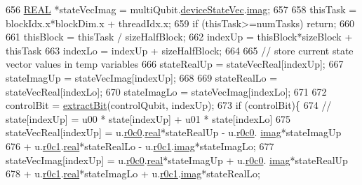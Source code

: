 \begin{DoxyCode}
656     \mbox{\hyperlink{QuEST__precision_8h_a4b654506f18b8bfd61ad2a29a7e38c25}{REAL}} *stateVecImag = multiQubit.\mbox{\hyperlink{structMultiQubit_a59ac613486a41b8c9a4b6e79cc8d2cc3}{deviceStateVec}}.\mbox{\hyperlink{structComplexArray_a79dde47c7ae530c79cebfdf57b225968}{imag}};
657 
658     thisTask = blockIdx.x*blockDim.x + threadIdx.x;
659     \textcolor{keywordflow}{if} (thisTask>=numTasks) \textcolor{keywordflow}{return};
660 
661     thisBlock   = thisTask / sizeHalfBlock;
662     indexUp     = thisBlock*sizeBlock + thisTask%
663     indexLo     = indexUp + sizeHalfBlock;
664 
665     \textcolor{comment}{// store current state vector values in temp variables}
666     stateRealUp = stateVecReal[indexUp];
667     stateImagUp = stateVecImag[indexUp];
668 
669     stateRealLo = stateVecReal[indexLo];
670     stateImagLo = stateVecImag[indexLo];
671 
672     controlBit = \mbox{\hyperlink{QuEST__env__localGPU_8cu_a6ffa51987d8ad8f6c0fc07fd3492277f}{extractBit}}(controlQubit, indexUp);
673     \textcolor{keywordflow}{if} (controlBit)\{
674         \textcolor{comment}{// state[indexUp] = u00 * state[indexUp] + u01 * state[indexLo]}
675         stateVecReal[indexUp] = u.\mbox{\hyperlink{structComplexMatrix2_ae72b4458233b077a636beee1892e81ff}{r0c0}}.\mbox{\hyperlink{structComplex_a479ad939835457595fcca3ca55c06283}{real}}*stateRealUp - u.\mbox{\hyperlink{structComplexMatrix2_ae72b4458233b077a636beee1892e81ff}{r0c0}}.
      \mbox{\hyperlink{structComplex_a1151948284b21c0052f203f23ab931d9}{imag}}*stateImagUp 
676             + u.\mbox{\hyperlink{structComplexMatrix2_a0f3932f055a8b05cef361bce25d51172}{r0c1}}.\mbox{\hyperlink{structComplex_a479ad939835457595fcca3ca55c06283}{real}}*stateRealLo - u.\mbox{\hyperlink{structComplexMatrix2_a0f3932f055a8b05cef361bce25d51172}{r0c1}}.\mbox{\hyperlink{structComplex_a1151948284b21c0052f203f23ab931d9}{imag}}*stateImagLo;
677         stateVecImag[indexUp] = u.\mbox{\hyperlink{structComplexMatrix2_ae72b4458233b077a636beee1892e81ff}{r0c0}}.\mbox{\hyperlink{structComplex_a479ad939835457595fcca3ca55c06283}{real}}*stateImagUp + u.\mbox{\hyperlink{structComplexMatrix2_ae72b4458233b077a636beee1892e81ff}{r0c0}}.
      \mbox{\hyperlink{structComplex_a1151948284b21c0052f203f23ab931d9}{imag}}*stateRealUp 
678             + u.\mbox{\hyperlink{structComplexMatrix2_a0f3932f055a8b05cef361bce25d51172}{r0c1}}.\mbox{\hyperlink{structComplex_a479ad939835457595fcca3ca55c06283}{real}}*stateImagLo + u.\mbox{\hyperlink{structComplexMatrix2_a0f3932f055a8b05cef361bce25d51172}{r0c1}}.\mbox{\hyperlink{structComplex_a1151948284b21c0052f203f23ab931d9}{imag}}*stateRealLo;

\end{DoxyCode}
